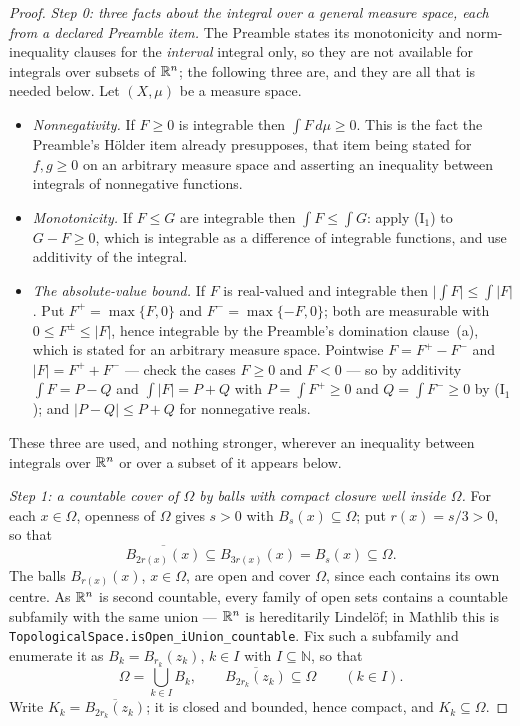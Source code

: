 \begin{proof}
\medskip
\noindent\emph{Step 0: three facts about the integral over a general measure
space, each from a declared Preamble item.}  The Preamble states its
monotonicity and norm-inequality clauses for the \emph{interval} integral only,
so they are not available for integrals over subsets of $\mathbb{R}^n$; the following
three are, and they are all that is needed below.  Let $(X,\mu)$ be a measure
space.
\begin{itemize}
\item[($\mathrm I_1$)] \emph{Nonnegativity.}  If $F\ge0$ is integrable then
  $\int F\,d\mu\ge0$.  This is the fact the Preamble's H\"older item already
  presupposes, that item being stated for $f,g\ge0$ on an arbitrary measure
  space and asserting an inequality between integrals of nonnegative functions.
\item[($\mathrm I_2$)] \emph{Monotonicity.}  If $F\le G$ are integrable then
  $\int F\le\int G$: apply ($\mathrm I_1$) to $G-F\ge0$, which is integrable as a
  difference of integrable functions, and use additivity of the integral.
\item[($\mathrm I_3$)] \emph{The absolute-value bound.}  If $F$ is
  real-valued and integrable then $\bigl|\int F\bigr|\le\int|F|$.  Put
  $F^+=\max\{F,0\}$ and $F^-=\max\{-F,0\}$; both are measurable with
  $0\le F^{\pm}\le|F|$, hence integrable by the Preamble's domination clause~(a),
  which is stated for an arbitrary measure space.  Pointwise $F=F^+-F^-$ and
  $|F|=F^++F^-$ --- check the cases $F\ge0$ and $F<0$ --- so by additivity
  $\int F=P-Q$ and $\int|F|=P+Q$ with $P=\int F^+\ge0$ and $Q=\int F^-\ge0$ by
  ($\mathrm I_1$); and $|P-Q|\le P+Q$ for nonnegative reals.
\end{itemize}
These three are used, and nothing stronger, wherever an inequality between
integrals over $\mathbb{R}^n$ or over a subset of it appears below.

\medskip
\noindent\emph{Step 1: a countable cover of $\Omega$ by balls with compact
closure well inside $\Omega$.}  For each $x\in\Omega$, openness of $\Omega$
gives $s>0$ with $B_s(x)\subseteq\Omega$; put $r(x)=s/3>0$, so that
\[
\overline{B_{2r(x)}(x)}\subseteq B_{3r(x)}(x)=B_s(x)\subseteq\Omega .
\]
The balls $B_{r(x)}(x)$, $x\in\Omega$, are open and cover $\Omega$, since each
contains its own centre.  As $\mathbb{R}^n$ is second countable, every family of open
sets contains a countable subfamily with the same union --- $\mathbb{R}^n$ is
hereditarily Lindel\"of; in Mathlib this is
\texttt{TopologicalSpace.isOpen\_iUnion\_countable}.  Fix such a subfamily and
enumerate it as $B_k=B_{r_k}(z_k)$, $k\in I$ with $I\subseteq\mathbb N$, so that
\[
\Omega=\bigcup_{k\in I}B_k ,
\qquad
\overline{B_{2r_k}(z_k)}\subseteq\Omega
\qquad(k\in I).
\tag{1}
\]
Write $K_k=\overline{B_{2r_k}(z_k)}$; it is closed and bounded, hence compact,
and $K_k\subseteq\Omega$.


\end{proof}
